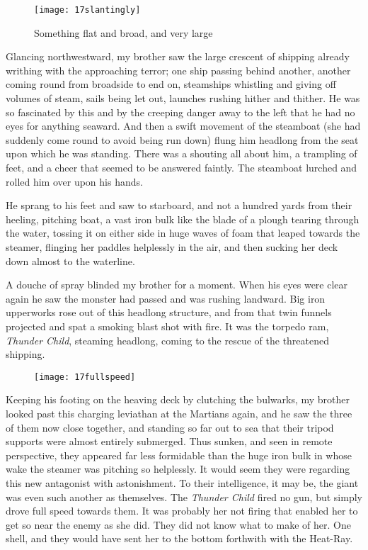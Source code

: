 \begin{figure}[p]
\centering
\texttt{[image: 17slantingly]}
\caption{Something flat and broad, and very large}
\end{figure}

Glancing northwestward, my brother saw the large crescent of shipping already writhing with the approaching terror; one ship passing behind another, another coming round from broadside to end on, steamships whistling and giving off volumes of steam, sails being let out, launches rushing hither and thither. He was so fascinated by this and by the creeping danger away to the left that he had no eyes for anything seaward. And then a swift movement of the steamboat (she had suddenly come round to avoid being run down) flung him headlong from the seat upon which he was standing. There was a shouting all about him, a trampling of feet, and a cheer that seemed to be answered faintly. The steamboat lurched and rolled him over upon his hands.

He sprang to his feet and saw to starboard, and not a hundred yards from their heeling, pitching boat, a vast iron bulk like the blade of a plough tearing through the water, tossing it on either side in huge waves of foam that leaped towards the steamer, flinging her paddles helplessly in the air, and then sucking her deck down almost to the waterline.

A douche of spray blinded my brother for a moment. When his eyes were clear again he saw the monster had passed and was rushing landward. Big iron upperworks rose out of this headlong structure, and from that twin funnels projected and spat a smoking blast shot with fire. It was the torpedo ram, \textit{Thunder Child}, steaming headlong, coming to the rescue of the threatened shipping.

\begin{figure}[tb!]
\centering
\texttt{[image: 17fullspeed]}
\end{figure}

Keeping his footing on the heaving deck by clutching the bulwarks, my brother looked past this charging leviathan at the Martians again, and he saw the three of them now close together, and standing so far out to sea that their tripod supports were almost entirely submerged. Thus sunken, and seen in remote perspective, they appeared far less formidable than the huge iron bulk in whose wake the steamer was pitching so helplessly. It would seem they were regarding this new antagonist with astonishment. To their intelligence, it may be, the giant was even such another as themselves. The \textit{Thunder Child} fired no gun, but simply drove full speed towards them. It was probably her not firing that enabled her to get so near the enemy as she did. They did not know what to make of her. One shell, and they would have sent her to the bottom forthwith with the Heat-Ray.

